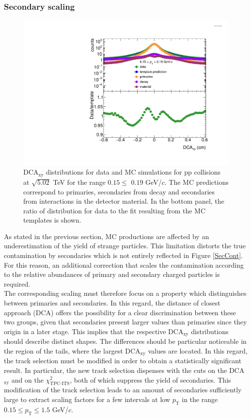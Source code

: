 \documentclass[12pt,a4paper]{report}
\begin{document}
\subsubsection{Secondary scaling}
\begin{figure}[tb!]
\centering
\includegraphics[width=12cm]{Plots/DCAdistributions.pdf}  
\caption{DCA$_\text{xy}$ distributions for data and MC simulations for pp collisions at $\sqrt{5.02}$ TeV for the \pt range $0.15 \leq $ \pt $0.19$ GeV/$c$. The MC predictions correspond to primaries, secondaries from decay and secondaries from interactions in the detector material. In the bottom panel, the ratio of distribution for data to the fit resulting from the MC templates is shown.}
\label{secScaling}
\end{figure}
As stated in the previous section, MC productions are affected by an underestimation of the yield of strange particles. This limitation distorts the true contamination by secondaries which is not entirely reflected in Figure \ref{SecCont}. For this reason, an additional correction that scales the contamination according to the relative abundances of primary and secondary charged particles is required.\\
The corresponding scaling must therefore focus on a property which distinguishes between primaries and secondaries. In this regard, the distance of closest approach (DCA) offers the possibility for a clear discrimination between these two groups, given that secondaries present larger values than primaries since they origin in a later stage. This implies that the respective DCA$_{\text{xy}}$ distributions should describe distinct shapes. The differences should be particular noticeable in the region of the tails, where the largest DCA$_{\text{xy}}$ values are located. In this regard, the track selection must be modified in order to obtain a statistically significant result. In particular, the new track selection dispenses with the cuts on the DCA$_\text{xy}$ and on the  $\chi^2_\text{TPC-ITS}$, both of which suppress the yield of secondaries. This modification of the track selection leads to an amount of secondaries sufficiently large to extract scaling factors for a few intervals at low $p_\text{T}$ in the range $0.15 \leq p_\text{T} \leq 1.5 $ GeV/$c$.\\
\end{document}
